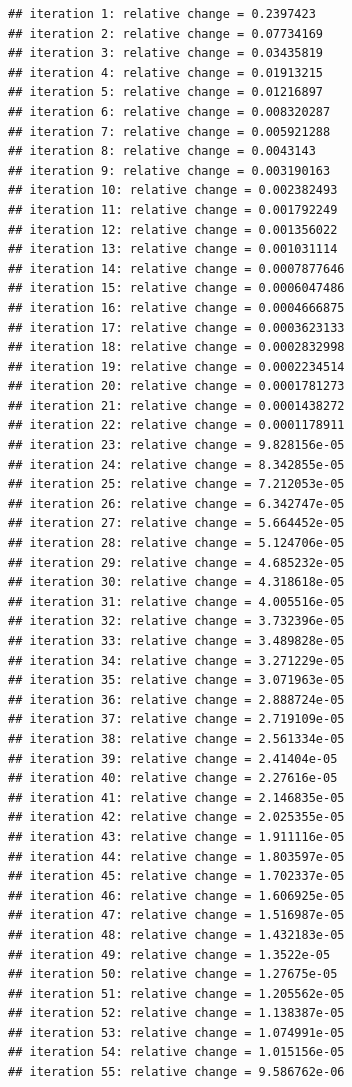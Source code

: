 \documentclass[
  11pt,
]{article}
\begin{document}
\begin{verbatim}
## iteration 1: relative change = 0.2397423
## iteration 2: relative change = 0.07734169
## iteration 3: relative change = 0.03435819
## iteration 4: relative change = 0.01913215
## iteration 5: relative change = 0.01216897
## iteration 6: relative change = 0.008320287
## iteration 7: relative change = 0.005921288
## iteration 8: relative change = 0.0043143
## iteration 9: relative change = 0.003190163
## iteration 10: relative change = 0.002382493
## iteration 11: relative change = 0.001792249
## iteration 12: relative change = 0.001356022
## iteration 13: relative change = 0.001031114
## iteration 14: relative change = 0.0007877646
## iteration 15: relative change = 0.0006047486
## iteration 16: relative change = 0.0004666875
## iteration 17: relative change = 0.0003623133
## iteration 18: relative change = 0.0002832998
## iteration 19: relative change = 0.0002234514
## iteration 20: relative change = 0.0001781273
## iteration 21: relative change = 0.0001438272
## iteration 22: relative change = 0.0001178911
## iteration 23: relative change = 9.828156e-05
## iteration 24: relative change = 8.342855e-05
## iteration 25: relative change = 7.212053e-05
## iteration 26: relative change = 6.342747e-05
## iteration 27: relative change = 5.664452e-05
## iteration 28: relative change = 5.124706e-05
## iteration 29: relative change = 4.685232e-05
## iteration 30: relative change = 4.318618e-05
## iteration 31: relative change = 4.005516e-05
## iteration 32: relative change = 3.732396e-05
## iteration 33: relative change = 3.489828e-05
## iteration 34: relative change = 3.271229e-05
## iteration 35: relative change = 3.071963e-05
## iteration 36: relative change = 2.888724e-05
## iteration 37: relative change = 2.719109e-05
## iteration 38: relative change = 2.561334e-05
## iteration 39: relative change = 2.41404e-05
## iteration 40: relative change = 2.27616e-05
## iteration 41: relative change = 2.146835e-05
## iteration 42: relative change = 2.025355e-05
## iteration 43: relative change = 1.911116e-05
## iteration 44: relative change = 1.803597e-05
## iteration 45: relative change = 1.702337e-05
## iteration 46: relative change = 1.606925e-05
## iteration 47: relative change = 1.516987e-05
## iteration 48: relative change = 1.432183e-05
## iteration 49: relative change = 1.3522e-05
## iteration 50: relative change = 1.27675e-05
## iteration 51: relative change = 1.205562e-05
## iteration 52: relative change = 1.138387e-05
## iteration 53: relative change = 1.074991e-05
## iteration 54: relative change = 1.015156e-05
## iteration 55: relative change = 9.586762e-06
\end{verbatim}
\end{document}
